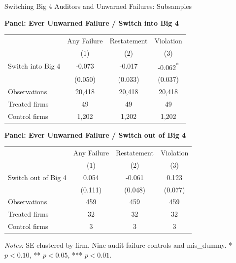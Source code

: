 \documentclass[10pt]{article}
\newcommand{\sym}[1]{\textsuperscript{#1}}
\begin{document}
\fontsize{10}{12}\selectfont
\setlength{\tabcolsep}{3pt}\renewcommand{\arraystretch}{1.15}
\begin{center}\large Switching Big 4 Auditors and Unwarned Failures: Subsamples\end{center}
\medskip\textbf{Panel: Ever Unwarned Failure / Switch into Big 4}\par\smallskip
\begin{tabular*}{\textwidth}{@{\extracolsep{\fill}}lccc@{}}
\toprule
 & Any Failure & Restatement & Violation \\
 & (1) & (2) & (3) \\
\midrule
Switch into Big 4 & -0.073 & -0.017 & -0.062\sym{*} \\
 & (0.050) & (0.033) & (0.037) \\
Observations & 20,418 & 20,418 & 20,418 \\
Treated firms & 49 & 49 & 49 \\
Control firms & 1,202 & 1,202 & 1,202 \\
\bottomrule\end{tabular*}\par
\medskip\textbf{Panel: Ever Unwarned Failure / Switch out of Big 4}\par\smallskip
\begin{tabular*}{\textwidth}{@{\extracolsep{\fill}}lccc@{}}
\toprule
 & Any Failure & Restatement & Violation \\
 & (1) & (2) & (3) \\
\midrule
Switch out of Big 4 & 0.054 & -0.061 & 0.123 \\
 & (0.111) & (0.048) & (0.077) \\
Observations & 459 & 459 & 459 \\
Treated firms & 32 & 32 & 32 \\
Control firms & 3 & 3 & 3 \\
\bottomrule\end{tabular*}\par
\medskip\fontsize{9}{11}\selectfont\textit{Notes:} SE clustered by firm. Nine audit-failure controls and mis\_dummy. * $p<0.10$, ** $p<0.05$, *** $p<0.01$.
\end{document}
